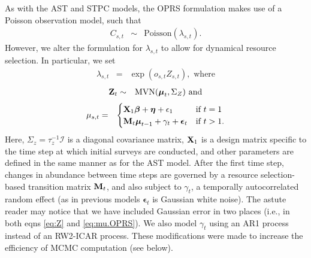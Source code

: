\documentclass[12pt,fleqn]{article}
\begin{document}
\begin{flushleft}
As with the AST and STPC models, the OPRS formulation makes use of a Poisson observation model, such that
\begin{eqnarray*}
  C_{s,t} & \sim & \textrm{Poisson}(\lambda_{s,t}).
\end{eqnarray*}
However, we alter the formulation for $\lambda_{s,t}$ to allow for dynamical resource selection.  In
particular, we set
\begin{eqnarray*}
  \lambda_{s,t} & = & \exp(o_{s,t} Z_{s,t}), \textrm{ where}
\end{eqnarray*}
\begin{eqnarray}
  {\bf Z}_t & \sim & \textrm{MVN}(\boldsymbol{\mu}_t,\Sigma_Z) \textrm{ and}
  \label{eq:Z}
\end{eqnarray}
\begin{eqnarray}
  \mu_{s,t} & = &  \begin{cases}
                    {\bf X}_1 \boldsymbol{\beta} + \boldsymbol{\eta} + \epsilon_1 & \text{if }t=1 \\
                     {\bf M}_t \boldsymbol{\mu}_{t-1} + \gamma_t + \boldsymbol{\epsilon}_t & \text{if }t>1.
                  \end{cases}
  \label{eq:mu.OPRS}
\end{eqnarray}
Here, $\Sigma_z = \tau_z^{-1} \mathcal{I}$ is a diagonal covariance matrix, ${\bf X}_{1}$ is a design matrix specific to the time step at which initial surveys are conducted, and other parameters are defined in the same manner as for the AST model. After the first time step, changes in abundance between time steps are governed by a resource selection-based transition matrix ${\bf M}_t$, and also subject to $\gamma_t$, a temporally autocorrelated random effect (as in previous models $\boldsymbol{\epsilon}_t$ is Gaussian white noise).
The astute reader may notice that we have included Gaussian error in two places (i.e., in both eqns \ref{eq:Z} and \ref{eq:mu.OPRS}).  We also model $\gamma_t$ using an AR1 process instead of an RW2-ICAR process. These modifications were made to increase the efficiency of MCMC computation (see below).


\end{flushleft}
\end{document}
